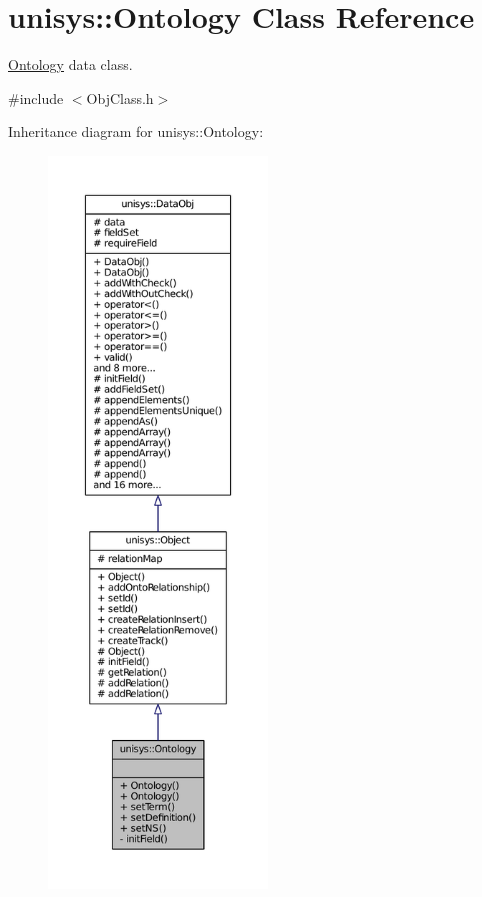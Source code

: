\hypertarget{classunisys_1_1Ontology}{\section{unisys\-:\-:Ontology Class Reference}
\label{classunisys_1_1Ontology}
}


\hyperlink{classunisys_1_1Ontology}{Ontology} data class.  




{\ttfamily \#include $<$Obj\-Class.\-h$>$}



Inheritance diagram for unisys\-:\-:Ontology\-:
\nopagebreak
\begin{figure}[H]
\begin{center}
\leavevmode
\includegraphics[height=550pt]{classunisys_1_1Ontology__inherit__graph}
\end{center}
\end{figure}


